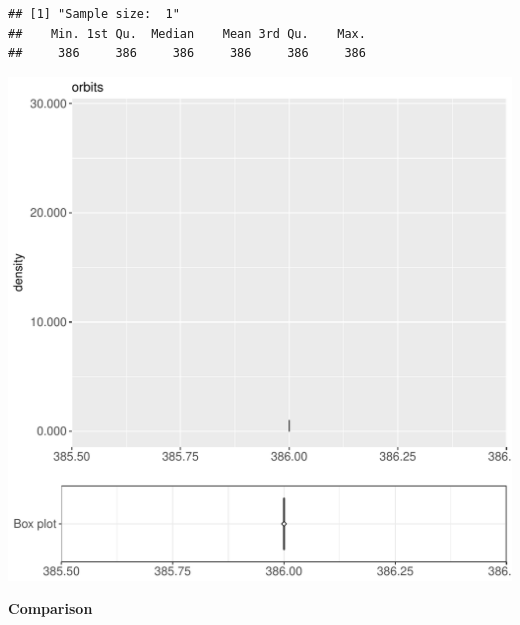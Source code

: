 \documentclass{article}\usepackage[]{graphicx}\usepackage[]{color}
\makeatletter
\def\maxwidth{ %
  \ifdim\Gin@nat@width>\linewidth
    \linewidth
  \else
    \Gin@nat@width
  \fi
}
\newenvironment{kframe}{%
 \def\at@end@of@kframe{}%
 \ifinner\ifhmode%
  \def\at@end@of@kframe{\end{minipage}}%
  \begin{minipage}{\columnwidth}%
 \fi\fi%
 \def\FrameCommand##1{\hskip\@totalleftmargin \hskip-\fboxsep
 \colorbox{shadecolor}{##1}\hskip-\fboxsep
     \hskip-\linewidth \hskip-\@totalleftmargin \hskip\columnwidth}%
 \MakeFramed {\advance\hsize-\width
   \@totalleftmargin\z@ \linewidth\hsize
   \@setminipage}}%
 {\par\unskip\endMakeFramed%
 \at@end@of@kframe}
\newenvironment{knitrout}{}{} %
\makeatother
\begin{document}
\begin{knitrout}
\color{fgcolor}\begin{kframe}
\begin{verbatim}
## [1] "Sample size:  1"
##    Min. 1st Qu.  Median    Mean 3rd Qu.    Max. 
##     386     386     386     386     386     386
\end{verbatim}


{\ttfamily\noindent\bfseries{}}\end{kframe}
\includegraphics[width=\maxwidth]{figure/RH7_cashewExceptRemove_small-1} 

\end{knitrout}
  
 \textbf{Comparison}
  
\end{document}
